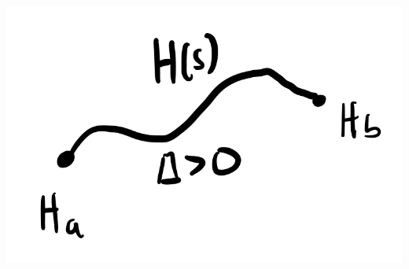 \begin{center}
    \includegraphics[scale=0.35]{Lectures/Images/lec11-interpolation.png}
\end{center}

